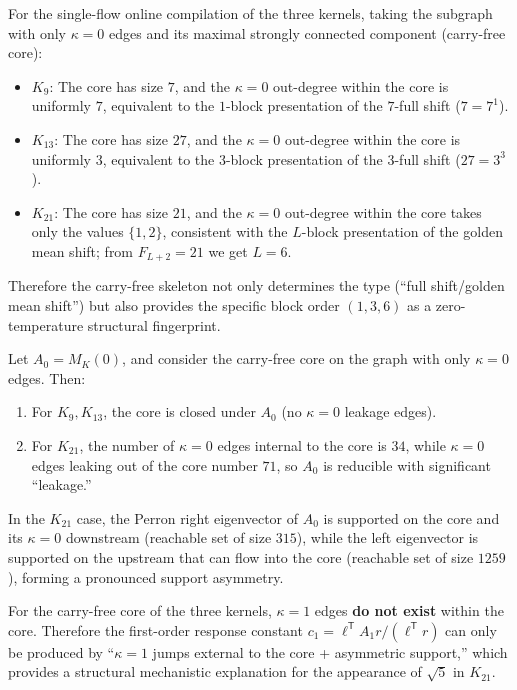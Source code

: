 \begin{proposition}\label{prop:carry-free-core-block}
For the single-flow online compilation of the three kernels, taking the subgraph with only $\kappa=0$ edges and its maximal strongly connected component (carry-free core):
\begin{itemize}
  \item $K_9$: The core has size $7$, and the $\kappa=0$ out-degree within the core is uniformly $7$, equivalent to the $1$-block presentation of the $7$-full shift ($7=7^1$).
  \item $K_{13}$: The core has size $27$, and the $\kappa=0$ out-degree within the core is uniformly $3$, equivalent to the $3$-block presentation of the $3$-full shift ($27=3^3$).
  \item $K_{21}$: The core has size $21$, and the $\kappa=0$ out-degree within the core takes only the values $\{1,2\}$, consistent with the $L$-block presentation of the golden mean shift; from $F_{L+2}=21$ we get $L=6$.
\end{itemize}
Therefore the carry-free skeleton not only determines the type (``full shift/golden mean shift'') but also provides the specific block order $(1,3,6)$ as a zero-temperature structural fingerprint.
\end{proposition}

\begin{proposition}\label{prop:carry-free-leakage}
Let $A_0=M_K(0)$, and consider the carry-free core on the graph with only $\kappa=0$ edges. Then:
\begin{enumerate}
  \item For $K_9,K_{13}$, the core is closed under $A_0$ (no $\kappa=0$ leakage edges).
  \item For $K_{21}$, the number of $\kappa=0$ edges internal to the core is $34$, while $\kappa=0$ edges leaking out of the core number $71$, so $A_0$ is reducible with significant ``leakage.''
\end{enumerate}
In the $K_{21}$ case, the Perron right eigenvector of $A_0$ is supported on the core and its $\kappa=0$ downstream (reachable set of size $315$), while the left eigenvector is supported on the upstream that can flow into the core (reachable set of size $1259$), forming a pronounced support asymmetry.
\end{proposition}

\begin{proposition}\label{prop:no-kappa1-in-core}
For the carry-free core of the three kernels, $\kappa=1$ edges \textbf{do not exist} within the core. Therefore the first-order response constant
\(
c_1=\ell^{\mathsf T}A_1r/(\ell^{\mathsf T}r)
\)
can only be produced by ``$\kappa=1$ jumps external to the core + asymmetric support,'' which provides a structural mechanistic explanation for the appearance of $\sqrt5$ in $K_{21}$.
\end{proposition}

